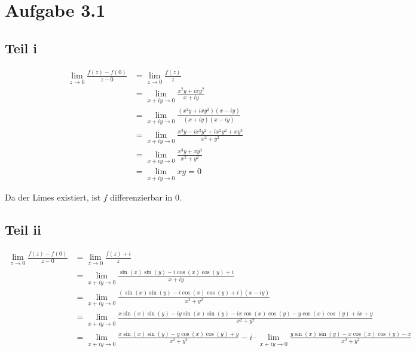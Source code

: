 \documentclass[10pt,a4paper]{article}
\begin{document}
\section{Aufgabe 3.1}

\subsection{Teil i}

\begin{align*}
  \lim_{z \to 0} \frac{f(z) - f(0)}{z - 0} & = \lim_{z \to 0} \frac{f(z)}{z}\\
                                           & = \lim_{x + iy \to 0} \frac{x^{2}y + ixy^{2}}{x + iy}\\
                                           & = \lim_{x + iy \to 0} \frac{(x^{2}y + ixy^{2})(x - iy)}{(x + iy)(x - iy)}\\
                                           & = \lim_{x + iy \to 0} \frac{x^{3}y - ix^{2}y^{2} + ix^{2}y^{2} + xy^{3}}{x^{2} + y^{2}}\\
                                           & = \lim_{x + iy \to 0} \frac{x^{3}y + xy^{3}}{x^{2} + y^{2}}\\
                                           & = \lim_{x + iy \to 0} xy = 0
\end{align*}

Da der Limes existiert, ist $f$ differenzierbar in $0$.

\subsection{Teil ii}

\begin{align*}
  \lim_{z \to 0} \frac{f(z) - f(0)}{z - 0} & = \lim_{z \to 0} \frac{f(z) + i}{z}\\
                                           & = \lim_{x + iy \to 0} \frac{\sin(x)\sin(y) - i\cos(x)\cos(y) + i}{x + iy}\\
                                           & = \lim_{x + iy \to 0} \frac{(\sin(x)\sin(y) - i\cos(x)\cos(y) + i)(x - iy)}{x^{2} + y^{2}}\\
                                           & = \lim_{x + iy \to 0} \frac{x\sin(x)\sin(y) - iy\sin(x)\sin(y) - ix\cos(x)\cos(y) - y\cos(x)\cos(y) + ix + y}{x^{2} + y^{2}}\\
                                           & = \lim_{x + iy \to 0} \frac{x\sin(x)\sin(y) - y\cos(x)\cos(y) + y}{x^{2} + y^{2}} - i \cdot \lim_{x + iy \to 0} \frac{y\sin(x)\sin(y) - x\cos(x)\cos(y) - x}{x^{2} + y^{2}}\\
\end{align*}
\end{document}
